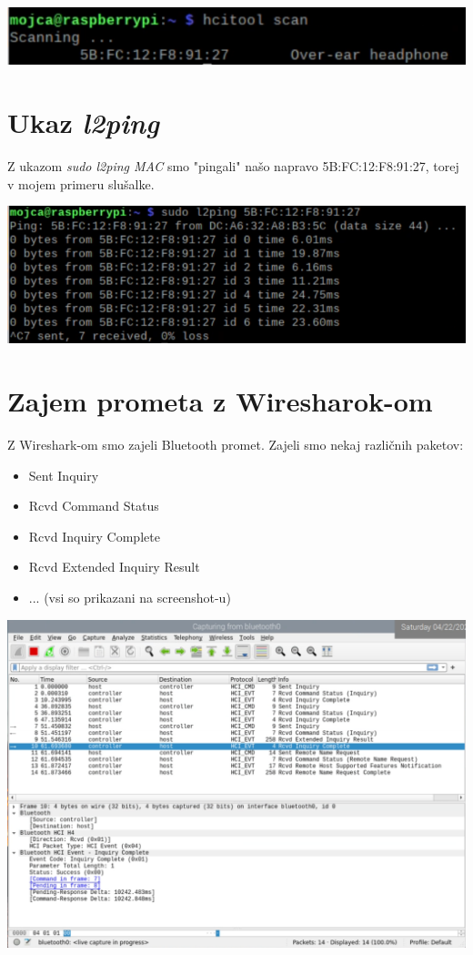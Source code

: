 \documentclass[11pt,a4paper,slovene]{article}
\begin{document}
\includegraphics[width=\textwidth]{hcitool}

\section{Ukaz \textit{l2ping}}
Z ukazom \textit{sudo l2ping MAC} smo "pingali" našo napravo 5B:FC:12:F8:91:27, torej v mojem primeru slušalke.

\includegraphics[width=\textwidth]{l2ping}

\section{Zajem prometa z Wiresharok-om}
Z Wireshark-om smo zajeli Bluetooth promet. Zajeli smo nekaj različnih paketov:

\begin{itemize}
	\item Sent Inquiry
	\item Rcvd Command Status
	\item Rcvd Inquiry Complete
	\item Rcvd Extended Inquiry Result
	\item ... (vsi so prikazani na screenshot-u)
\end{itemize}

\includegraphics[width=\textwidth]{inquiry_complete}

\pagebreak
\nocite{*}
\end{document}
